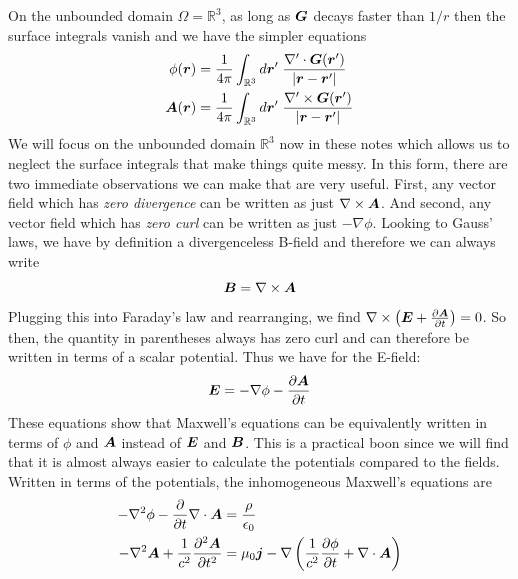 \documentclass[twocolumn]{gwclass}
\newcommand{\R}{\mathbb{R}}
\begin{document}
	On the unbounded domain $\Omega=\R^3$, as long as $\boldsymbol{G}$ decays faster than $1/r$ then the surface integrals vanish and we have the simpler equations
\begin{align*}
	\phi(\*r) &= \frac{1}{4\pi}\int_{\R^3} d\*r'\;\frac{\nabla'\cdot\*G(\*r')}{\abs{\*r-\*r'}}\\
	\*A(\*r) &= \frac{1}{4\pi}\int_{\R^3} d\*r'\;\frac{\nabla'\times\*G(\*r')}{\abs{\*r-\*r'}}
\end{align*}
	We will focus on the unbounded domain $\R^3$ now in these notes which allows us to neglect the surface integrals that make things quite messy. In this form, there are two immediate observations we can make that are very useful. First, any vector field which has \emph{zero divergence} can be written as just $\nabla\times\boldsymbol{A}$. And second, any vector field which has \emph{zero curl} can be written as just $-\nabla\phi$. Looking to Gauss' laws, we have by definition a divergenceless B-field and therefore we can always write
	$$ \boldsymbol{B}=\nabla\times\boldsymbol{A} $$
	Plugging this into Faraday's law and rearranging, we find $ \nabla\times\left(\boldsymbol{E} + \frac{\partial \boldsymbol{A}}{\partial t}\right) = 0 $. So then, the quantity in parentheses always has zero curl and can therefore be written in terms of a scalar potential. Thus we have for the E-field:
	$$ \boldsymbol{E} = -\nabla\phi - \frac{\partial\boldsymbol{A}}{\partial t} $$
	These equations show that Maxwell's equations can be equivalently written in terms of $\phi$ and $\boldsymbol{A}$ instead of $\boldsymbol{E}$ and $\boldsymbol{B}$. This is a practical boon since we will find that it is almost always easier to calculate the potentials compared to the fields. Written in terms of the potentials, the inhomogeneous Maxwell's equations are 
	\begin{align*} 
		-\nabla^2\phi -  \frac{\partial}{\partial t}\nabla\cdot\boldsymbol{A} &= \frac{\rho}{\epsilon_0} \\
		 -\nabla^2\boldsymbol{A} + \frac{1}{c^2} \frac{\partial^2\boldsymbol{A}}{\partial t^2} &= \mu_0\boldsymbol{j} - \nabla\left( \frac{1}{c^2}\frac{\partial\phi}{\partial t} + \nabla\cdot\boldsymbol{A} \right) 
	 \end{align*}
 
\end{document}
